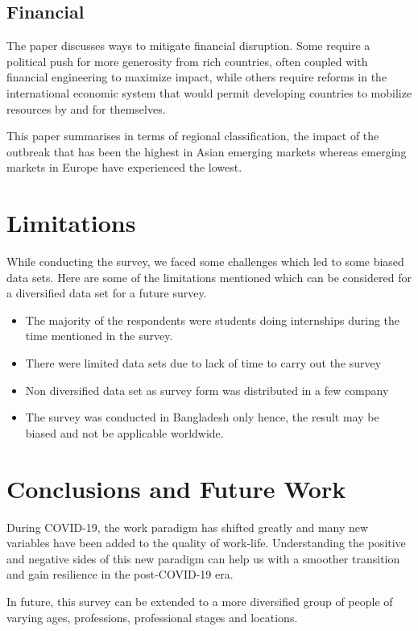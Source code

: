 \documentclass[11pt]{article}
\begin{document}
\subsection {Financial}
The paper \cite{saad1} discusses ways to mitigate financial disruption. Some require a political push for more generosity from rich countries, often coupled with financial engineering to maximize impact, while others require reforms in the international economic system that would permit developing countries to mobilize resources by and for themselves.

This paper \cite{saad2} summarises in terms of regional classification, the impact of the outbreak that has been the highest in Asian emerging markets whereas emerging markets in Europe have experienced the lowest.

\section{Limitations}
While conducting the survey, we faced some challenges which led to some biased data sets. Here are some of the limitations mentioned which can be considered for a diversified data set for a future survey.
\begin{itemize}
  \item The majority of the respondents were students doing internships during the time mentioned in the survey.
  \item There were limited data sets due to lack of time to carry out the survey
  \item Non diversified data set as survey form was distributed in a few company 
  \item The survey was conducted in Bangladesh only hence, the result may be biased and not be applicable worldwide.
\end{itemize}

\section{Conclusions and Future Work}
During COVID-19, the work paradigm has shifted greatly and many new variables have been added to the quality of work-life.  Understanding the positive and negative sides of this new paradigm can help us with a smoother transition and gain resilience in the post-COVID-19 era.

In future,  this survey can be extended to a more diversified group of people of varying ages, professions, professional stages and locations. 



\end{document}
